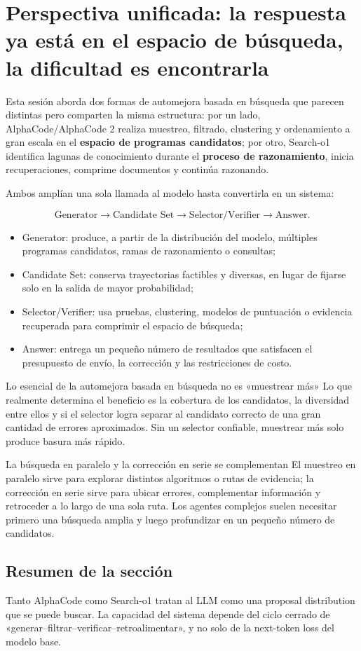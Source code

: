\section{Perspectiva unificada: la respuesta ya está en el espacio de búsqueda, la dificultad es encontrarla}

Esta sesión aborda dos formas de automejora basada en búsqueda que parecen distintas pero comparten la misma estructura: por un lado, AlphaCode/AlphaCode 2 realiza muestreo, filtrado, clustering y ordenamiento a gran escala en el \textbf{espacio de programas candidatos}; por otro, Search-o1 identifica lagunas de conocimiento durante el \textbf{proceso de razonamiento}, inicia recuperaciones, comprime documentos y continúa razonando.

Ambos amplían una sola llamada al modelo hasta convertirla en un sistema:

$$
\text{Generator}\rightarrow \text{Candidate Set}\rightarrow
\text{Selector/Verifier}\rightarrow \text{Answer}.
$$

\begin{itemize}
    \item Generator: produce, a partir de la distribución del modelo, múltiples programas candidatos, ramas de razonamiento o consultas;
    \item Candidate Set: conserva trayectorias factibles y diversas, en lugar de fijarse solo en la salida de mayor probabilidad;
    \item Selector/Verifier: usa pruebas, clustering, modelos de puntuación o evidencia recuperada para comprimir el espacio de búsqueda;
    \item Answer: entrega un pequeño número de resultados que satisfacen el presupuesto de envío, la corrección y las restricciones de costo.
\end{itemize}

\begin{importantbox}{Lo esencial de la automejora basada en búsqueda no es «muestrear más»}
Lo que realmente determina el beneficio es la cobertura de los candidatos, la diversidad entre ellos y si el selector logra separar al candidato correcto de una gran cantidad de errores aproximados. Sin un selector confiable, muestrear más solo produce basura más rápido.
\end{importantbox}

\begin{knowledgebox}{La búsqueda en paralelo y la corrección en serie se complementan}
El muestreo en paralelo sirve para explorar distintos algoritmos o rutas de evidencia; la corrección en serie sirve para ubicar errores, complementar información y retroceder a lo largo de una sola ruta. Los agentes complejos suelen necesitar primero una búsqueda amplia y luego profundizar en un pequeño número de candidatos.
\end{knowledgebox}

\subsection{Resumen de la sección}

Tanto AlphaCode como Search-o1 tratan al LLM como una proposal distribution que se puede buscar. La capacidad del sistema depende del ciclo cerrado de «generar–filtrar–verificar–retroalimentar», y no solo de la next-token loss del modelo base.

